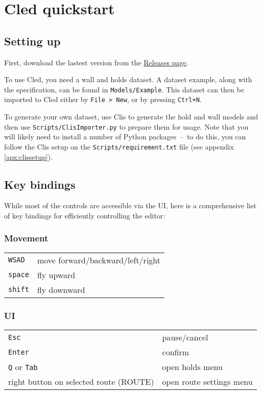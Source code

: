 \chapter{Cled quickstart}\label{apx:cled}

\section{Setting up}
First, download the lastest version from the \href{https://github.com/Climber-Tools/Cled/releases}{Releases page}.

To use Cled, you need a wall and holds dataset.
A dataset example, along with the specification, can be found in \verb|Models/Example|.
This dataset can then be imported to Cled either by \verb|File > New|, or by pressing
\verb|Ctrl+N|.

To generate your own dataset, use Clis \cite{clis} to generate the hold and wall models and then use \verb|Scripts/ClisImporter.py| to prepare them for usage.
Note that you will likely need to install a number of Python packages~--~to do this, you can follow the Clis setup on the \verb|Scripts/requirement.txt| file (see appendix \ref{apx:clissetup}).

\section{Key bindings}

While most of the controls are accessible via the UI, here is a comprehensive list of key bindings for efficiently controlling the editor:

\subsection{Movement}

\begin{tabular}[]{@{}ll@{}}
\toprule
\verb|WSAD| & move forward/backward/left/right \\
\verb|space| & fly upward \\
\verb|shift| & fly downward \\
\bottomrule
\end{tabular}

\subsection{UI}

\begin{tabular}[]{@{}ll@{}}
\toprule
\verb|Esc| & pause/cancel \\
\verb|Enter| & confirm \\
\verb|Q| or \verb|Tab| & open holds menu \\
right button on selected route (ROUTE) & open route settings menu \\
\bottomrule
\end{tabular}

